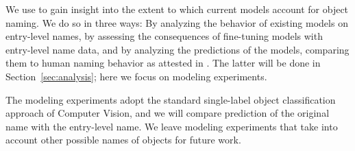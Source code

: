 


We use \mn to gain insight into the extent to which current models account for object naming.
We do so in three ways: By analyzing the behavior of existing models on entry-level names, by assessing the consequences of fine-tuning models with entry-level name data, and by analyzing the predictions of the models, comparing them to human naming behavior as attested in \mn.
The latter will be done in Section~\ref{sec:analysis}; here we focus on modeling experiments.

The modeling experiments adopt the standard single-label object classification approach of Computer Vision, and we will compare prediction of the original \vg name with the entry-level name.
We leave modeling experiments that take into account other possible names of objects for future work.

